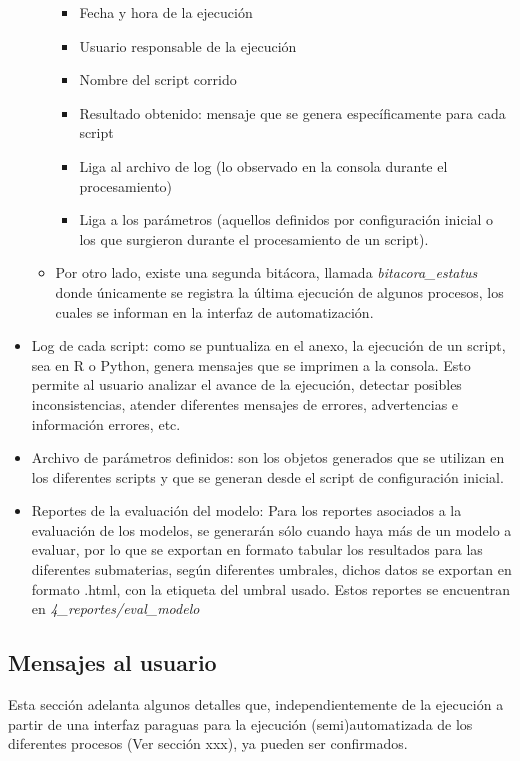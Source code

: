 \documentclass[
]{article}
\begin{document}
\begin{itemize}
\begin{itemize}
    \begin{itemize}
    \item
      Fecha y hora de la ejecución
    \item
      Usuario responsable de la ejecución
    \item
      Nombre del script corrido
    \item
      Resultado obtenido: mensaje que se genera específicamente para cada script
    \item
      Liga al archivo de log (lo observado en la consola durante el procesamiento)
    \item
      Liga a los parámetros (aquellos definidos por configuración inicial o los que surgieron durante el procesamiento de un script).
    \end{itemize}
  \item
    Por otro lado, existe una segunda bitácora, llamada \emph{bitacora\_estatus} donde únicamente se registra la última ejecución de algunos procesos, los cuales se informan en la interfaz de automatización.
  \end{itemize}
\item
  Log de cada script: como se puntualiza en el anexo, la ejecución de un script, sea en R o Python, genera mensajes que se imprimen a la consola. Esto permite al usuario analizar el avance de la ejecución, detectar posibles inconsistencias, atender diferentes mensajes de errores, advertencias e información errores, etc.
\item
  Archivo de parámetros definidos: son los objetos generados que se utilizan en los diferentes scripts y que se generan desde el script de configuración inicial.
\item
  Reportes de la evaluación del modelo: Para los reportes asociados a la evaluación de los modelos, se generarán sólo cuando haya más de un modelo a evaluar, por lo que se exportan en formato tabular los resultados para las diferentes submaterias, según diferentes umbrales, dichos datos se exportan en formato .html, con la etiqueta del umbral usado. Estos reportes se encuentran en \emph{4\_reportes/eval\_modelo}
\end{itemize}

\hypertarget{mensajesGeneral}{%
\subsection{Mensajes al usuario}\label{mensajesGeneral}}

Esta sección adelanta algunos detalles que, independientemente de la ejecución a partir de una interfaz paraguas para la ejecución (semi)automatizada de los diferentes procesos (Ver sección xxx), ya pueden ser confirmados.
\end{document}
